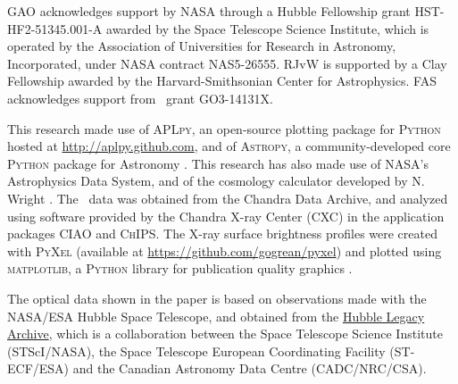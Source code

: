 GAO acknowledges support by NASA through a Hubble Fellowship grant HST-HF2-51345.001-A awarded by the Space Telescope Science Institute, which is operated by the Association of Universities for Research in Astronomy, Incorporated, under NASA contract NAS5-26555. RJvW is supported by a Clay Fellowship awarded by the Harvard-Smithsonian Center for Astrophysics. FAS acknowledges support from \chandra\ grant GO3-14131X.

This research made use of \textsc{APLpy}, an open-source plotting package for \textsc{Python} hosted at \url{http://aplpy.github.com}, and of \textsc{Astropy}, a community-developed core \textsc{Python} package
  for Astronomy \citep{astropy}. This research has also made use of NASA's Astrophysics Data System, and of the cosmology calculator developed by N. Wright \citep{Wright2006}. The \chandra\ data was obtained from the Chandra Data Archive, and analyzed using software provided by the Chandra X-ray Center (CXC) in the application packages \textsc{CIAO} and \textsc{ChIPS}. The X-ray surface brightness profiles were created with \textsc{PyXel} (available at \url{https://github.com/gogrean/pyxel}) and plotted using \textsc{matplotlib}, a \textsc{Python} library for publication quality graphics \citep{Hunter2007}.
  
 The optical data shown in the paper is based on observations made with the NASA/ESA Hubble Space Telescope, and obtained from the \href{http://hla.stsci.edu/}{Hubble Legacy Archive}, which is a collaboration between the Space Telescope Science Institute (STScI/NASA), the Space Telescope European Coordinating Facility (ST-ECF/ESA) and the Canadian Astronomy Data Centre (CADC/NRC/CSA).
